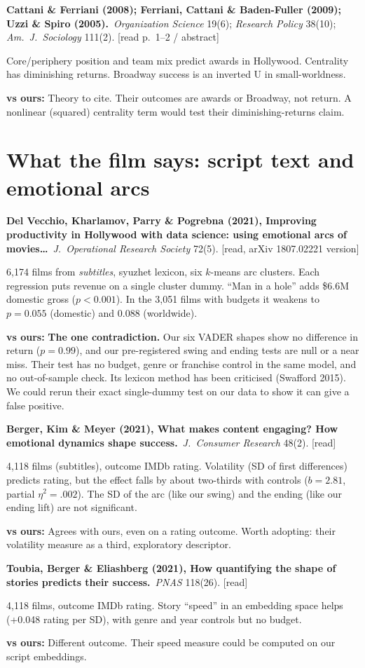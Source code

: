 \documentclass[10pt]{article}
\newcommand{\paper}[2]{\par\smallskip\textbf{#1}\ #2\par}
\newcommand{\vs}[1]{\par{\color{accent}\textbf{vs ours:}} #1\par}
\newcommand{\src}[1]{{\small\color{muted}[#1]}}
\begin{document}
\paper{Cattani \& Ferriani (2008); Ferriani, Cattani \& Baden-Fuller (2009); Uzzi \& Spiro (2005).}{\textit{Organization Science} 19(6); \textit{Research Policy} 38(10); \textit{Am.\ J.\ Sociology} 111(2). \src{read p.~1--2 / abstract}}
Core/periphery position and team mix predict awards in Hollywood. Centrality has diminishing returns. Broadway success is an inverted U in small-worldness.
\vs{Theory to cite. Their outcomes are awards or Broadway, not return. A nonlinear (squared) centrality term would test their diminishing-returns claim.}

\section{What the film says: script text and emotional arcs}

\paper{Del Vecchio, Kharlamov, Parry \& Pogrebna (2021), Improving productivity in Hollywood with data science: using emotional arcs of movies\ldots}{\textit{J.\ Operational Research Society} 72(5). \src{read, arXiv 1807.02221 version}}
6,174 films from \emph{subtitles}, syuzhet lexicon, six $k$-means arc clusters. Each regression puts revenue on a single cluster dummy. ``Man in a hole'' adds \$6.6M domestic gross ($p < 0.001$). In the 3,051 films with budgets it weakens to $p = 0.055$ (domestic) and $0.088$ (worldwide).
\vs{\textbf{The one contradiction.} Our six VADER shapes show no difference in return ($p = 0.99$), and our pre-registered swing and ending tests are null or a near miss. Their test has no budget, genre or franchise control in the same model, and no out-of-sample check. Its lexicon method has been criticised (Swafford 2015). We could rerun their exact single-dummy test on our data to show it can give a false positive.}

\paper{Berger, Kim \& Meyer (2021), What makes content engaging? How emotional dynamics shape success.}{\textit{J.\ Consumer Research} 48(2). \src{read}}
4,118 films (subtitles), outcome IMDb rating. Volatility (SD of first differences) predicts rating, but the effect falls by about two-thirds with controls ($b = 2.81$, partial $\eta^2 = .002$). The SD of the arc (like our swing) and the ending (like our ending lift) are not significant.
\vs{Agrees with ours, even on a rating outcome. Worth adopting: their volatility measure as a third, exploratory descriptor.}

\paper{Toubia, Berger \& Eliashberg (2021), How quantifying the shape of stories predicts their success.}{\textit{PNAS} 118(26). \src{read}}
4,118 films, outcome IMDb rating. Story ``speed'' in an embedding space helps (+0.048 rating per SD), with genre and year controls but no budget.
\vs{Different outcome. Their speed measure could be computed on our script embeddings.}
\end{document}
